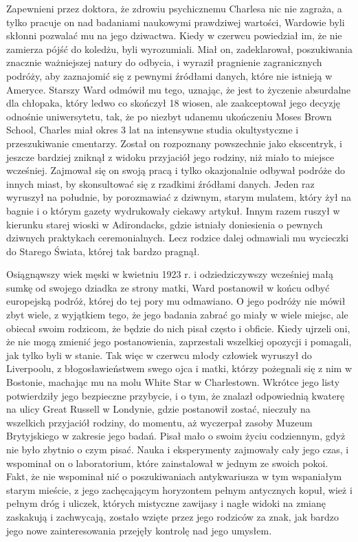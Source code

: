 Zapewnieni przez doktora, że zdrowiu psychicznemu Charlesa nic nie zagraża, a tylko pracuje on nad badaniami naukowymi prawdziwej wartości, Wardowie byli skłonni pozwalać mu na jego dziwactwa. Kiedy w czerwcu powiedział im, że nie zamierza pójść do koledżu, byli wyrozumiali. Miał on, zadeklarował, poszukiwania znacznie ważniejszej natury do odbycia, i wyraził pragnienie zagranicznych podróży, aby zaznajomić się z pewnymi źródłami danych, które nie istnieją w Ameryce. Starszy Ward odmówił mu tego, uznając, że jest to życzenie absurdalne dla chłopaka, który ledwo co skończył 18 wiosen, ale zaakceptował jego decyzję odnośnie uniwersytetu, tak, że po niezbyt udanemu ukończeniu Moses Brown School, Charles miał okres 3 lat na intensywne studia okultystyczne i przeszukiwanie cmentarzy. Został on rozpoznany powszechnie jako ekscentryk, i jeszcze bardziej zniknął z widoku przyjaciół jego rodziny, niż miało to miejsce wcześniej. Zajmował się on swoją pracą i tylko okazjonalnie odbywał podróże do innych miast, by skonsultować się z rzadkimi źródłami danych. Jeden raz wyruszył na południe, by porozmawiać z dziwnym, starym mulatem, który żył na bagnie i o którym gazety wydrukowały ciekawy artykuł. Innym razem ruszył w kierunku starej wioski w Adirondacks, gdzie istniały doniesienia o pewnych dziwnych praktykach ceremonialnych. Lecz rodzice dalej odmawiali mu wycieczki do Starego Świata, której tak bardzo pragnął. 

Osiągnąwszy wiek męski w kwietniu 1923 r. i odziedziczywszy wcześniej małą sumkę od swojego dziadka ze strony matki, Ward postanowił w końcu odbyć europejską podróż, której do tej pory mu odmawiano. O jego podróży nie mówił zbyt wiele, z wyjątkiem tego, że jego badania zabrać go miały w wiele miejsc, ale obiecał swoim rodzicom, że będzie do nich pisał często i obficie. Kiedy ujrzeli oni, że nie mogą zmienić jego postanowienia, zaprzestali wszelkiej opozycji i pomagali, jak tylko byli w stanie. Tak więc w czerwcu młody człowiek wyruszył do Liverpoolu, z błogosławieństwem swego ojca i matki, którzy pożegnali się z nim w Bostonie, machając mu na molu White Star w Charlestown. Wkrótce jego listy potwierdziły jego bezpieczne przybycie, i o tym, że znalazł odpowiednią kwaterę na ulicy Great Russell w Londynie, gdzie postanowił zostać, nieczuły na wszelkich przyjaciół rodziny, do momentu, aż wyczerpał zasoby Muzeum Brytyjskiego w zakresie jego badań. Pisał mało o swoim życiu codziennym, gdyż nie było zbytnio o czym pisać. Nauka i eksperymenty zajmowały cały jego czas, i wspominał on o laboratorium, które zainstalował w jednym ze swoich pokoi. Fakt, że nie wspominał nić o poszukiwaniach antykwariusza w tym wspaniałym starym mieście, z jego zachęcającym horyzontem pełnym antycznych kopuł, wież i pełnym dróg i uliczek, których mistyczne zawijasy  i nagłe widoki na zmianę zaskakują i zachwycają, zostało wzięte przez jego rodziców za znak, jak bardzo jego nowe zainteresowania przejęły kontrolę nad jego umysłem.

